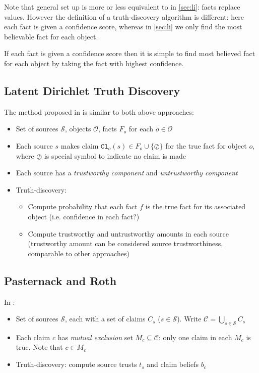 \documentclass{article}
\theoremstyle{definition} \newtheorem{definition}{Definition}
\theoremstyle{definition} \newtheorem{example}{Example}
\theoremstyle{plain} \newtheorem{axiom}{Axiom}
\theoremstyle{plain} \newtheorem*{remark}{Remark}
\theoremstyle{remark} \newtheorem*{notation}{Notation}
\theoremstyle{plain} \newtheorem{lemma}{Lemma}
\theoremstyle{plain} \newtheorem{proposition}{Proposition}
\renewcommand{\S}{\mathcal{S}}  %
\renewcommand{\O}{\mathcal{O}}  %
\begin{document}
Note that general set up is more or less equivalent to in \ref{sec:li}: facts
replace values. However the definition of a truth-discovery algorithm is
different: here each fact is given a confidence score, whereas in \ref{sec:li}
we only find the most believable fact for each object.

If each fact is given a confidence score then it is simple to find most
believed fact for each object by taking the fact with highest confidence.

\subsection{Latent Dirichlet Truth Discovery}
\label{sec:ldt}

The method proposed in \cite{zhang_qi_tang} is similar to both above approaches:

\begin{itemize}
\item Set of sources $\S$, objects $\O$, facts $F_o$ for each $o \in \O$
\item Each source $s$ makes claim $\texttt{Cl}_o(s) \in F_o \cup
\{\oslash\}$ for the true fact for object $o$, where $\oslash$ is special
symbol to indicate no claim is made
\item Each source has a \emph{trustworthy component} and \emph{untrustworthy
component}
\item Truth-discovery:
    \begin{itemize}
    \item Compute probability that each fact $f$ is the true fact for its
    associated object (i.e. confidence in each fact?)
    \item Compute trustworthy and untrustworthy amounts in each source
    (trustworthy amount can be considered source trustworthiness, comparable to
    other approaches)
    \end{itemize}
\end{itemize}

\subsection{Pasternack and Roth}
\label{sec:past}

In \cite{pasternack}:

\begin{itemize}
\item Set of sources $\S$, each with a set of claims $C_s$ ($s \in \S$). Write
$\mathcal{C} = \bigcup_{s \in \S}{C_s}$
\item Each claim $c$ has \emph{mutual exclusion} set $M_c \subseteq
\mathcal{C}$: only one claim in each $M_c$ is true. Note that $c \in M_c$
\item Truth-discovery: compute source trusts $t_s$ and claim beliefs $b_c$
\end{itemize}
\end{document}
